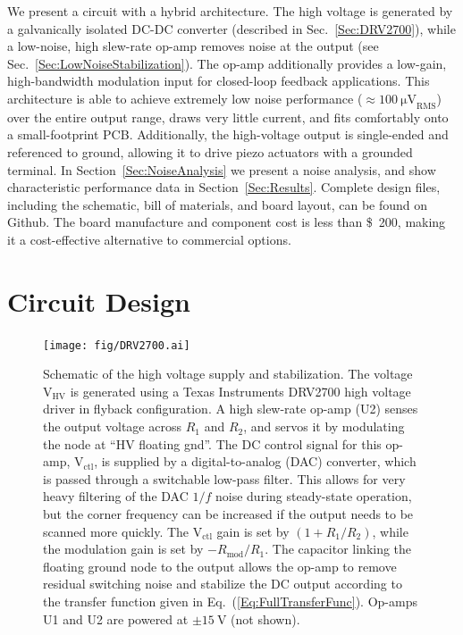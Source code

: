 \documentclass[aip,rsi,reprint]{revtex4-1} %
\begin{document}
We present a circuit with a hybrid architecture. The high voltage is generated by a galvanically isolated DC-DC converter (described in Sec.~\ref{Sec:DRV2700}), while a low-noise, high slew-rate op-amp removes noise at the output  (see Sec.~\ref{Sec:LowNoiseStabilization}).
The op-amp additionally provides a low-gain, high-bandwidth modulation input for closed-loop feedback applications.
This architecture is able to achieve extremely low noise performance ($\approx\SI{100}{\micro\volt}_{\text{RMS}}$) over the entire output range, draws very little current, and fits comfortably onto a small-footprint PCB.
Additionally, the high-voltage output is single-ended and referenced to ground, allowing it to drive piezo actuators with a grounded terminal.
In Section~\ref{Sec:NoiseAnalysis} we present a noise analysis, and show characteristic performance data in Section~\ref{Sec:Results}.
Complete design files, including the schematic, bill of materials, and board layout, can be found on Github\cite{DesignFiles}.
The board manufacture and component cost is less than \SI{200}[\$]{}, making it a cost-effective alternative to commercial options. 



\section{Circuit Design}
\label{Sec:Circuit}

\begin{figure}[t]
\texttt{[image: fig/DRV2700.ai]}
\caption{Schematic of the high voltage supply and stabilization.
The voltage $\text{V}_\text{HV}$ is generated using a Texas Instruments DRV2700 high voltage driver in flyback configuration.
A high slew-rate op-amp (U2) senses the output voltage across $R_1$ and $R_2$, and servos it by modulating the node at ``HV floating gnd''.
The DC control signal for this op-amp,  $\text{V}_{\text{ctl}}$, is supplied by a digital-to-analog (DAC) converter, which is passed through a switchable low-pass filter. This allows for very heavy filtering of the DAC $1/f$ noise during steady-state operation, but the corner frequency can be increased if the output needs to be scanned more quickly.
The $\text{V}_{\text{ctl}}$ gain is set by $\left(1+R_1/R_2\right)$, while the modulation gain is set by $-R_{\text{mod}}/R_1$.
The capacitor linking the floating ground node to the output allows the op-amp to remove residual switching noise and stabilize the DC output according to the transfer function given in Eq.~(\ref{Eq:FullTransferFunc}).
Op-amps U1 and U2 are powered at $\pm\SI{15}{\volt}$ (not shown).
\label{Fig:PiezoCircuit}}
\end{figure}
\end{document}
